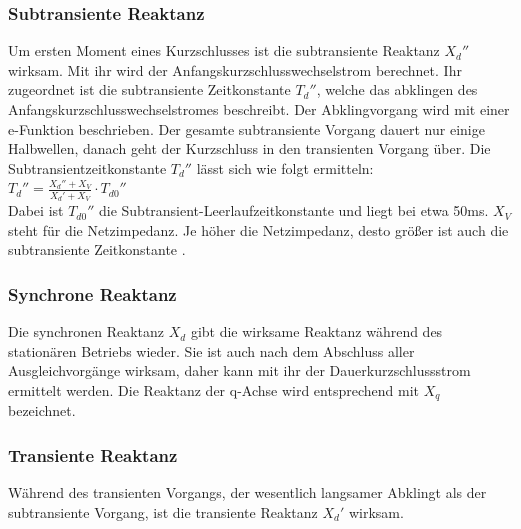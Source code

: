 \documentclass{scrartcl}
\begin{document}
\begin{onehalfspace}


\subsubsection{Subtransiente Reaktanz}
Um ersten Moment eines Kurzschlusses ist die subtransiente Reaktanz $X_d''$ wirksam. Mit ihr wird der Anfangskurzschlusswechselstrom berechnet. Ihr zugeordnet ist die subtransiente Zeitkonstante $T_d''$, welche das abklingen des Anfangskurzschlusswechselstromes beschreibt. Der Abklingvorgang wird mit einer e-Funktion beschrieben. Der gesamte subtransiente Vorgang dauert nur einige Halbwellen, danach geht der Kurzschluss in den transienten Vorgang über. Die Subtransientzeitkonstante $T_d''$ lässt sich wie folgt ermitteln: \\

$T_d'' = \frac{X_d'' + X_V}{X_d' + X_V} \cdot T_{d0}''$ \\

Dabei ist $T_{d0}''$ die Subtransient-Leerlaufzeitkonstante und liegt bei etwa 50ms. $X_V$ steht für die Netzimpedanz. Je höher die Netzimpedanz, desto größer ist auch die subtransiente Zeitkonstante \cite[S. 41]{Roeper1964}.



\subsubsection{Synchrone Reaktanz}
Die synchronen Reaktanz $X_d$ gibt die wirksame Reaktanz während des stationären Betriebs wieder. Sie ist auch nach dem Abschluss aller Ausgleichvorgänge wirksam, daher kann mit ihr der Dauerkurzschlussstrom ermittelt werden. Die Reaktanz der q-Achse wird entsprechend mit $X_q$ bezeichnet.

\subsubsection{Transiente Reaktanz}
Während des transienten Vorgangs, der wesentlich langsamer Abklingt als der subtransiente Vorgang, ist die transiente Reaktanz $X_d'$ wirksam.


\end{onehalfspace}
\end{document}
